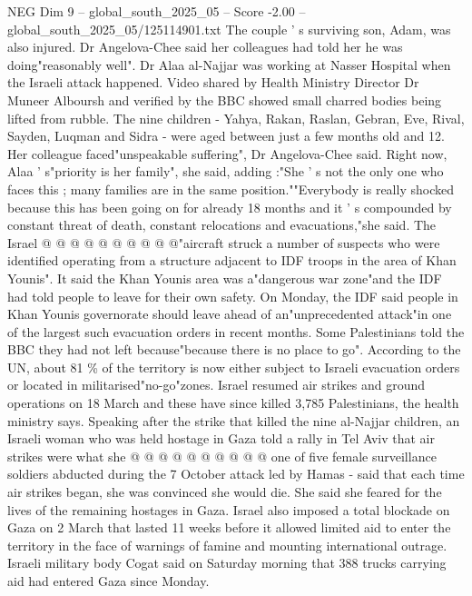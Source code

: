 \begin{textsample}{NEG Dim 9 – global\_south\_2025\_05 – Score -2.00 – global\_south\_2025\_05/125114901.txt}  \label{ex:f9_neg_247}
The couple ' s surviving son, Adam, was also injured.
Dr Angelova-Chee said her colleagues had told her he was doing"reasonably well".
Dr Alaa al-Najjar was working at Nasser Hospital when the Israeli attack happened.
Video shared by Health Ministry Director Dr Muneer Alboursh and verified by the BBC showed small charred bodies being lifted from rubble.
The nine children - Yahya, Rakan, Raslan, Gebran, Eve, Rival, Sayden, Luqman and Sidra - were aged between just a few months old and 12.
Her colleague faced"unspeakable suffering", Dr Angelova-Chee said.
Right now, Alaa ' s"priority is her family", she said, adding :"She ' s not the only one who faces this ; many families are in the same position.""Everybody is really shocked because this has been going on for already 18 months and it ' s compounded by constant threat of death, constant relocations and evacuations,"she said.
The Israel @ @ @ @ @ @ @ @ @ @"aircraft struck a number of suspects who were identified operating from a structure adjacent to IDF troops in the area of Khan Younis".
It said the Khan Younis area was a"dangerous war zone"and the IDF had told people to leave for their own safety.
On Monday, the IDF said people in Khan Younis governorate should leave ahead of an"unprecedented attack"in one of the largest such evacuation orders in recent months.
Some Palestinians told the BBC they had not left because"because there is no place to go".
According to the UN, about 81 \% of the territory is now either subject to Israeli evacuation orders or located in militarised"no-go"zones.
Israel resumed air strikes and ground operations on 18 March and these have since killed 3,785 Palestinians, the health ministry says.
Speaking after the strike that killed the nine al-Najjar children, an Israeli woman who was held hostage in Gaza told a rally in Tel Aviv that air strikes were what she @ @ @ @ @ @ @ @ @ @ one of five female surveillance soldiers abducted during the 7 October attack led by Hamas - said that each time air strikes began, she was convinced she would die.
She said she feared for the lives of the remaining hostages in Gaza.
Israel also imposed a total blockade on Gaza on 2 March that lasted 11 weeks before it allowed limited aid to enter the territory in the face of warnings of famine and mounting international outrage.
Israeli military body Cogat said on Saturday morning that 388 trucks carrying aid had entered Gaza since Monday.

\end{textsample}
